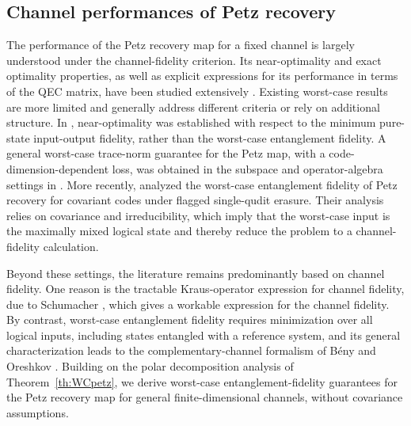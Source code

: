 \documentclass[10pt]{article}
\begin{document}
\subsection{Channel performances of Petz recovery} The performance of the Petz recovery map for a fixed channel is largely understood under the channel-fidelity criterion. Its near-optimality and exact optimality properties, as well as explicit expressions for its performance in terms of the QEC matrix, have been studied extensively \cite{barnum2002reversing,ng2010simple,zheng2024near,li2025optimality,kim2026optimal}. Existing worst-case results are more limited and generally address different criteria or rely on additional structure. In \cite{ng2010simple}, near-optimality was established with respect to the minimum pure-state input-output fidelity, rather than the worst-case entanglement fidelity. A general worst-case trace-norm guarantee for the Petz map, with a code-dimension-dependent loss, was obtained in the subspace and operator-algebra settings in \cite{chen2020entanglement}. More recently, \cite{elovenkova2026covariant} analyzed the worst-case entanglement fidelity of Petz recovery for covariant codes under flagged single-qudit erasure. Their analysis relies on covariance and irreducibility, which imply that the worst-case input is the maximally mixed logical state and thereby reduce the problem to a channel-fidelity calculation. 

Beyond these settings, the literature remains predominantly based on channel fidelity. One reason is the tractable Kraus-operator expression for channel fidelity, due to Schumacher \cite{schumacher1996sending}, which gives a workable expression for the channel fidelity. By contrast, worst-case entanglement fidelity requires minimization over all logical inputs, including states entangled with a reference system, and its general characterization leads to the complementary-channel formalism of B\'eny and Oreshkov \cite{beny2010general}. Building on the polar decomposition analysis of Theorem~\ref{th:WCpetz}, we derive worst-case entanglement-fidelity guarantees for the Petz recovery map for general finite-dimensional channels, without covariance assumptions.
\end{document}
